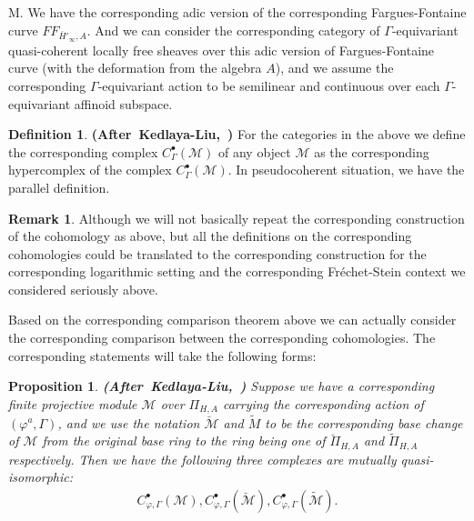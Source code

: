 \documentclass[12pt]{amsart}
\newtheorem{proposition}[theorem]{Proposition}
\theoremstyle{definition}
\newtheorem{definition}[theorem]{Definition}
\newtheorem{remark}[theorem]{Remark}
\numberwithin{equation}{section}
\begin{document}
\noindent M. We have the corresponding adic version of the corresponding Fargues-Fontaine curve $FF_{\overline{H}'_\infty,A}$. And we can consider the corresponding category of $\Gamma$-equivariant quasi-coherent locally free sheaves over this adic version of Fargues-Fontaine curve (with the deformation from the algebra $A$), and we assume the corresponding $\Gamma$-equivariant action to be semilinear and continuous over each $\Gamma$-equivariant affinoid subspace.



\begin{definition} \mbox{\bf{(After Kedlaya-Liu, \cite{KL16})}} For the categories in the above we define the corresponding complex $C^\bullet_{\Gamma}(\mathcal{M})$ of any object $\mathcal{M}$ as the corresponding hypercomplex of the complex $C^\bullet_{\Gamma}(\mathcal{M})$.	 In pseudocoherent situation, we have the parallel definition.
\end{definition}





\begin{remark}
Although we will not basically repeat the corresponding construction of the cohomology as above, but all the definitions on the corresponding cohomologies could be translated to the corresponding construction for the corresponding logarithmic setting and the corresponding Fr\'echet-Stein context we considered seriously above.	
\end{remark}








\indent Based on the corresponding comparison theorem above we can actually consider the corresponding comparison between the corresponding cohomologies. The corresponding statements will take the following forms:

\begin{proposition} \mbox{\bf{(After Kedlaya-Liu, \cite[Theorem 5.7.10]{KL16})}}
Suppose we have a corresponding finite projective module $\mathcal{M}$ over $\Pi_{H,A}$ carrying the corresponding action of $(\varphi^a,\Gamma)$, and we use the notation $\breve{\mathcal{M}}$ and $\widetilde{M}$ to be the corresponding base change of $\mathcal{M}$ from the original base ring to the ring being one of $\breve{\Pi}_{H,A}$ and $\widetilde{\Pi}_{H,A}$ respectively. Then we have the following three complexes are mutually quasi-isomorphic:
\begin{align}
C_{\varphi,\Gamma}^\bullet(\mathcal{M}),C_{\varphi,\Gamma}^\bullet(\breve{\mathcal{M}}),C_{\varphi,\Gamma}^\bullet(\widetilde{\mathcal{M}}).
\end{align}

	
\end{proposition}
\end{document}
